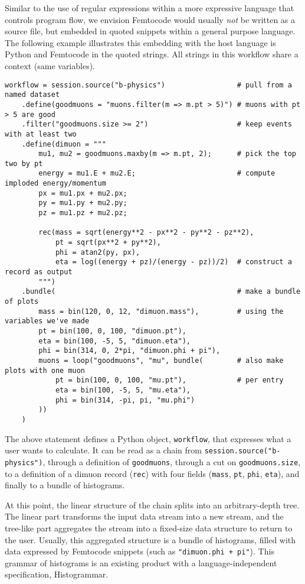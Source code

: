 \documentclass{article}
\begin{document}
Similar to the use of regular expressions within a more expressive language that controls program flow, we envision Femtocode would usually \textit{not} be written as a source file, but embedded in quoted snippets within a general purpose language. The following example illustrates this embedding with the host language is Python and Femtocode in the quoted strings. All strings in this workflow share a context (same variables).

\begin{verbatim}
workflow = session.source("b-physics")                 # pull from a named dataset
    .define(goodmuons = "muons.filter(m => m.pt > 5)") # muons with pt > 5 are good
    .filter("goodmuons.size >= 2")                     # keep events with at least two
    .define(dimuon = """
        mu1, mu2 = goodmuons.maxby(m => m.pt, 2);      # pick the top two by pt
        energy = mu1.E + mu2.E;                        # compute imploded energy/momentum
        px = mu1.px + mu2.px;
        py = mu1.py + mu2.py;
        pz = mu1.pz + mu2.pz;

        rec(mass = sqrt(energy**2 - px**2 - py**2 - pz**2),
            pt = sqrt(px**2 + py**2),
            phi = atan2(py, px),
            eta = log((energy + pz)/(energy - pz))/2)  # construct a record as output
        """)
    .bundle(                                           # make a bundle of plots
        mass = bin(120, 0, 12, "dimuon.mass"),         # using the variables we've made
        pt = bin(100, 0, 100, "dimuon.pt"),
        eta = bin(100, -5, 5, "dimuon.eta"),
        phi = bin(314, 0, 2*pi, "dimuon.phi + pi"),
        muons = loop("goodmuons", "mu", bundle(        # also make plots with one muon
            pt = bin(100, 0, 100, "mu.pt"),            # per entry
            eta = bin(100, -5, 5, "mu.eta"),
            phi = bin(314, -pi, pi, "mu.phi")
        ))
    )
\end{verbatim}

The above statement defines a Python object, {\tt workflow}, that expresses what a user wants to calculate. It can be read as a chain from {\tt session.source("b-physics")}, through a definition of {\tt goodmuons}, through a cut on {\tt goodmuons.size}, to a definition of a dimuon record ({\tt rec}) with four fields ({\tt mass}, {\tt pt}, {\tt phi}, {\tt eta}), and finally to a bundle of histograms.

At this point, the linear structure of the chain splits into an arbitrary-depth tree. The linear part transforms the input data stream into a new stream, and the tree-like part aggregates the stream into a fixed-size data structure to return to the user. Usually, this aggregated structure is a bundle of histograms, filled with data expressed by Femtocode snippets (such as {\tt "dimuon.phi + pi"}). This grammar of histograms is an existing product with a language-independent specification, Histogrammar\footnotemark.
\end{document}
